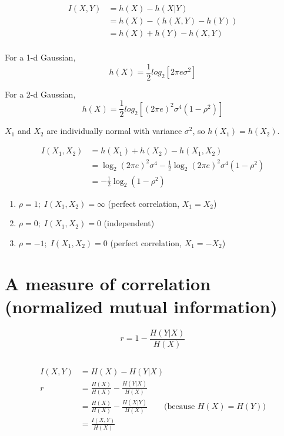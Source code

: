 \documentclass{article}
\begin{document}
\begin{align*}
  I(X,Y) &= h(X) - h(X|Y) \\
  &= h(X) - \left( h(X,Y) - h(Y) \right) \\
  &= h(X) + h(Y) - h(X,Y) \\
\end{align*}

For a 1-d Gaussian,
\[
h(X) = \frac{1}{2} log_2 \left[ 2 \pi e \sigma^2 \right]
\]

For a 2-d Gaussian,
\[
h(X) = \frac{1}{2} log_2 \left[ \left( 2 \pi e \right)^2 \sigma^4
  \left( 1 - \rho^2 \right) \right]
\]

$X_1$ and $X_2$ are individually normal with variance $\sigma^2$, so
$h(X_1) = h(X_2)$.

\begin{align*}
  I(X_1, X_2) &= h(X_1) + h(X_2) - h(X_1, X_2) \\
  &= \log_2 (2 \pi e)^2 \sigma^4 - \frac{1}{2} \log_2 (2 \pi e)^2
    \sigma^4 (1 - \rho^2) \\
  &= - \frac{1}{2} \log_2 (1 - \rho^2)
\end{align*}

\begin{enumerate}
  \item $\rho = 1; \; I(X_1, X_2) = \infty$ \qquad (perfect correlation,
    $X_1 = X_2$) \\
  \item $\rho = 0; \; I(X_1, X_2) = 0$ \qquad (independent) \\
  \item $\rho = -1; \; I(X_1, X_2) = 0$ \qquad (perfect correlation,
    $X_1 = -X_2$) \\
\end{enumerate}

\section{A measure of correlation (normalized mutual information)}

\begin{equation*}
  r = 1 - \frac{H(Y|X)}{H(X)}
\end{equation*}

\subsection{}
\begin{align*}
  I(X,Y) &= H(X) - H(Y|X) \\
  r &= \frac{H(X)}{H(X)} - \frac{H(Y|X)}{H(X)} \\
  &=  \frac{H(X)}{H(X)} - \frac{H(X|Y)}{H(X)} \qquad \text{(because }
    H(X) = H(Y)\text{)} \\
  &= \frac{I(X,Y)}{H(X)}
\end{align*}
\end{document}

